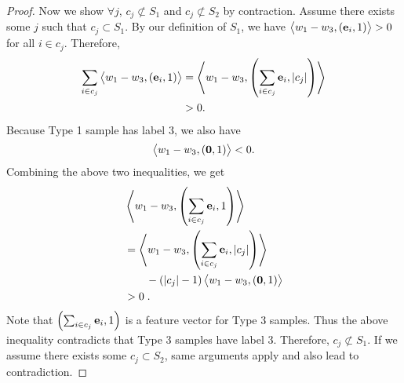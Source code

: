 \begin{proof}
Now we show $\forall j$, $c_j \not\subset S_1$ and $c_j \not\subset S_2$ by
contraction. Assume there exists some $j$ such that $c_j \subset S_1$. By our
definition of $S_1$, we have $\left\langle w_1-w_3, (\mathbf{e}_i, 1) \right\rangle > 0$ for all $i\in c_j$.
Therefore,
\begin{align*}
\sum_{i\in c_j} \left\langle w_1-w_3, \left(\mathbf{e}_i, 1\right) \right\rangle
& = \left\langle w_1-w_3, \left(\sum_{i\in c_j} \mathbf{e}_i, |c_j|\right) \right\rangle  \\
& > 0.
\end{align*}
Because Type 1 sample has label $3$, we also have
$$
\left\langle w_1-w_3, \left(\mathbf{0}, 1\right) \right\rangle < 0.
$$
Combining the above two inequalities, we get
\begin{align*}
& \left\langle w_1-w_3, \left(\sum_{i\in c_j}\mathbf{e}_i, 1\right) \right\rangle \\
& = \left\langle w_1-w_3, \left(\sum_{i\in c_j}\mathbf{e}_i, |c_j|\right) \right\rangle  \\
& \qquad - (|c_j|-1)\left\langle w_1-w_3, \left(\mathbf{0}, 1\right) \right\rangle \\
& > 0 \; .
\end{align*}
Note that $\left(\sum_{i\in c_j}\mathbf{e}_i, 1\right)$ is a feature vector for Type 3
samples. Thus the above inequality contradicts that Type 3 samples have label 3.
Therefore, $c_j \not\subset S_1$. If we assume there exists some $c_j \subset
S_2$, same arguments apply and also lead to contradiction.
\end{proof}
